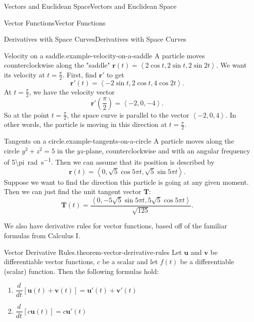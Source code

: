 \documentclass[10pt,]{book}
\numberwithin{equation}{section}
\newcommand{\vv}[1]{\mathbf{#1}}
\newcommand{\dv}[3][]{\dfrac{d^{#1} #2}{d #3^{#1}}}
\newcommand{\dotprod}[1]{\left\langle #1 \right\rangle}
\begin{document}
\begin{chapterptx}{Vectors and Euclidean Space}{}{Vectors and Euclidean Space}{}{}
\begin{sectionptx}{Vector Functions}{}{Vector Functions}{}{}
\begin{subsectionptx}{Derivatives with Space Curves}{}{Derivatives with Space Curves}{}{}
\begin{example}{Velocity on a saddle.}{example-velocity-on-a-saddle}
\hypertarget{p-1050}{}%
A particle moves counterclockwise along the "saddle" \(\vv{r}(t) = \dotprod{2\cos t, 2\sin t, 2\sin 2t}\). We want its velocity at \(t=\frac{\pi}{2}\). First, find \(\vv{r}'\) to get%
%
\begin{equation*}
\vv{r}'(t) = \dotprod{-2\sin t,2\cos t,4\cos2t}.
\end{equation*}
\hypertarget{p-1051}{}%
At \(t=\frac{\pi}{2}\), we have the velocity vector%
%
\begin{equation*}
\vv{r}'\left(\frac{\pi}{2}\right) = \dotprod{-2,0,-4}.
\end{equation*}
\hypertarget{p-1052}{}%
So at the point \(t=\frac{\pi}{2}\), the space curve is parallel to the vector \(\dotprod{-2,0,4}\). In other words, the particle is moving in this direction at \(t=\frac{\pi}{2}\).%
\end{example}
\begin{example}{Tangents on a circle.}{example-tangents-on-a-circle}%
\hypertarget{p-1053}{}%
A particle moves along the circle \(y^{2}+z^{2}=5\) in the \(yz\)-plane, counterclockwise and with an angular frequency of \SI{5\pi}{\radian\per\second}. Then we can assume that its position is described by%
%
\begin{equation*}
\vv{r}(t) = \dotprod{0,\sqrt{5}\cos5\pi t, \sqrt{5}\sin5\pi t}.
\end{equation*}
\hypertarget{p-1054}{}%
Suppose we want to find the direction this particle is going at any given moment. Then we can just find the unit tangent vector \(\vv{T}\):%
%
\begin{equation*}
\vv{T}(t) = \frac{\dotprod{0,-5\sqrt{5}\sin5\pi t, 5\sqrt{5}\cos5\pi t}}{\sqrt{125}}.
\end{equation*}
\end{example}
\hypertarget{p-1055}{}%
We also have derivative rules for vector functions, based off of the familiar formulas from Calculus I.%
\begin{theorem}{Vector Derivative Rules.}{}{theorem-vector-derivative-rules}%
\hypertarget{p-1056}{}%
Let \(\vv{u}\) and \(\vv{v}\) be differentiable vector functions, \(c\) be a scalar and let \(f(t)\) be a differentiable (scalar) function. Then the following formulas hold:%
\leavevmode%
\begin{enumerate}
\item\hypertarget{li-86}{}\(\dv{}{t}[\vv{u}(t)+\vv{v}(t)] = \vv{u}'(t)+\vv{v}'(t)\)%
\item\hypertarget{li-87}{}\(\dv{}{t}[c\vv{u}(t)] = c\vv{u}'(t)\)%

\end{enumerate}
\end{theorem}
\end{subsectionptx}
\end{sectionptx}
\end{chapterptx}
\end{document}
